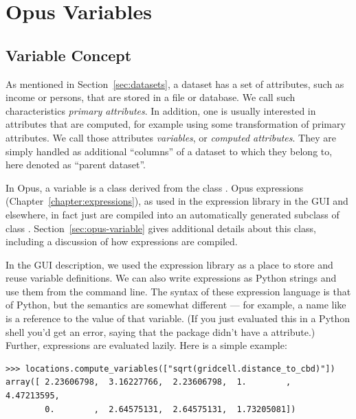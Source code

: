 %
\section{Opus Variables}
%
\label{sec:variables}
%
\subsection{Variable Concept}
%
\label{sec:variableconcept}
%


As mentioned in Section~\ref{sec:datasets}, a dataset has a set of
attributes, such as income or persons, that are stored in a file or database.
We call such characteristics \emph{primary attributes}.  
In addition, one is usually interested in attributes that are computed, for example using some
transformation of primary attributes.  We call those attributes \emph{variables},
or \emph{computed attributes}.
They are simply handled as additional
``columns'' of a dataset to which they belong to, here denoted as
``parent dataset''.

In Opus, a variable is a class derived from the
 class .  Opus expressions 
(Chapter~\ref{chapter:expressions}),
as used in the expression library in the GUI and elsewhere, in fact just
are compiled into an automatically generated subclass of class .
Section~\ref{sec:opus-variable} gives additional details about this class, 
including a discussion of how expressions are compiled.

In the GUI description, we used the expression library as a place to store and
reuse variable definitions.  We can also write expressions as Python strings
and use them from the command line.  The syntax of these expression language is 
that of Python, but the semantics
are somewhat different --- for example, a name like
 is a reference to the value of that
variable.  (If you just evaluated this in a Python shell you'd get an
error, saying that the  package didn't have a
 attribute.)  Further, expressions are evaluated lazily.
Here is a simple example:

\begin{verbatim}
>>> locations.compute_variables(["sqrt(gridcell.distance_to_cbd)"])
array([ 2.23606798,  3.16227766,  2.23606798,  1.        ,  4.47213595,
        0.        ,  2.64575131,  2.64575131,  1.73205081])
\end{verbatim}

